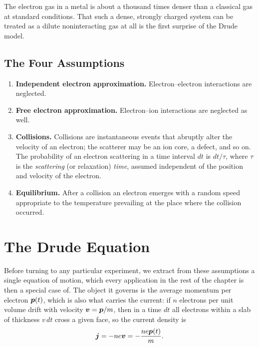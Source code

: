 \begin{fact}
The electron gas in a metal is about a thousand times denser than a classical gas at standard conditions. That such a dense, strongly charged system can be treated as a dilute noninteracting gas at all is the first surprise of the Drude model.
\end{fact}

\subsection{The Four Assumptions}

\begin{definition}
\begin{enumerate}
    \item \textbf{Independent electron approximation.} Electron--electron interactions are neglected.
    \item \textbf{Free electron approximation.} Electron--ion interactions are neglected as well.
    \item \textbf{Collisions.} Collisions are instantaneous events that abruptly alter the velocity of an electron; the scatterer may be an ion core, a defect, and so on. The probability of an electron scattering in a time interval $dt$ is $dt/\tau$, where $\tau$ is the \emph{scattering} (or relaxation) \emph{time}, assumed independent of the position and velocity of the electron.
    \item \textbf{Equilibrium.} After a collision an electron emerges with a random speed appropriate to the temperature prevailing at the place where the collision occurred.
\end{enumerate}
\end{definition}

\section{The Drude Equation}

Before turning to any particular experiment, we extract from these assumptions a single equation of motion, which every application in the rest of the chapter is then a special case of. The object it governs is the average momentum per electron $\bm{p}(t)$, which is also what carries the current: if $n$ electrons per unit volume drift with velocity $\bm{v} = \bm{p}/m$, then in a time $dt$ all electrons within a slab of thickness $v\,dt$ cross a given face, so the current density is
\begin{equation}
    \bm{j} = -ne\bm{v} = -\frac{ne\bm{p}(t)}{m}. \label{eq:drude-j}
\end{equation}

